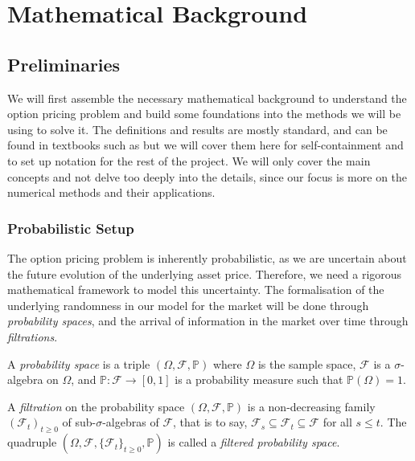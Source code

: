 \chapter{Mathematical Background}

\section{Preliminaries}

We will first assemble the necessary mathematical background to understand the option pricing problem and build some foundations into the methods we will be using to solve it. The definitions and results are mostly standard, and can be found in textbooks such as \cite{karatzas2014brownian, karatzas1998methods} but we will cover them here for self-containment and to set up notation for the rest of the project. We will only cover the main concepts and not delve too deeply into the details, since our focus is more on the numerical methods and their applications.

\subsection{Probabilistic Setup}

The option pricing problem is inherently probabilistic, as we are uncertain about the future evolution of the underlying asset price. Therefore, we need a rigorous mathematical framework to model this uncertainty. The formalisation of the underlying randomness in our model for the market will be done through \textit{probability spaces}, and the arrival of information in the market over time through \textit{filtrations}.

\begin{definition}
    A \textit{probability space} is a triple $(\Omega, \mathcal F, \mathbb P)$ where $\Omega$ is the sample space, $\mathcal F$ is a $\sigma$-algebra on $\Omega$, and $\mathbb P: \mathcal F \to [0, 1]$ is a probability measure such that $\mathbb P(\Omega) = 1$.
\end{definition}

\begin{definition}
    A \textit{filtration} on the probability space $(\Omega, \mathcal F, \mathbb P)$ is a non-decreasing family $(\mathcal F_t)_{t \ge 0}$ of sub-$\sigma$-algebras of $\mathcal F$, that is to say, $\mathcal F_s \subseteq \mathcal F_t \subseteq \mathcal F$ for all $s \le t$. The quadruple $\left(\Omega, \mathcal F, \{\mathcal F_t\}_{t \ge 0}, \mathbb P\right)$ is called a \textit{filtered probability space}.
\end{definition}

